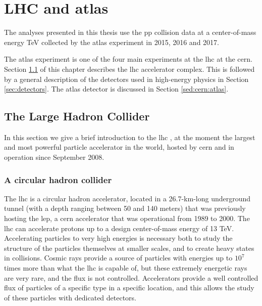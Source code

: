 \chapter{LHC and \gls{atlas}}
\label{chap:cern}

The analyses presented in this thesis use the \gls{pp} collision data at a center-of-mass energy \cmtre TeV 
collected by the \gls{atlas} experiment in 2015, 2016 and 2017. 

The \gls{atlas} experiment is one of the four main experiments at the \gls{lhc} at the \gls{cern}. Section \ref{sed:cern:lhc} of this chapter describes the \gls{lhc} accelerator complex. This is followed by a general description of the detectors used in high-energy physics in Section \ref{sec:detectors}. The \gls{atlas} detector is discussed in Section \ref{sed:cern:atlas}.


\section{The Large Hadron Collider}
\label{sed:cern:lhc}

In this section we give a brief introduction to the \gls{lhc} \cite{1748-0221-3-08-S08001}, at the moment the largest and most powerful particle accelerator in the world, hosted by \gls{cern} and in operation since September 2008.


\subsection{A circular hadron collider}

The \gls{lhc} is a circular hadron accelerator, located in a 26.7-km-long underground tunnel (with a depth ranging between 50 and 140 meters) that was previously hosting the \gls{lep}, a \gls{cern} accelerator that was operational from 1989 to 2000. The \gls{lhc} can accelerate protons up to a design center-of-mass energy of 13 TeV. Accelerating particles to very high energies is necessary both to study the structure of the particles themselves at smaller scales, and to create heavy states in collisions. Cosmic rays provide a source of particles with energies up to $10^7$ times more than what the \gls{lhc} is capable of, but these extremely energetic rays are very rare, and the flux is not controlled. Accelerators provide a well controlled flux of particles of a specific type in a specific location, and this allows the study of these particles with dedicated detectors.


